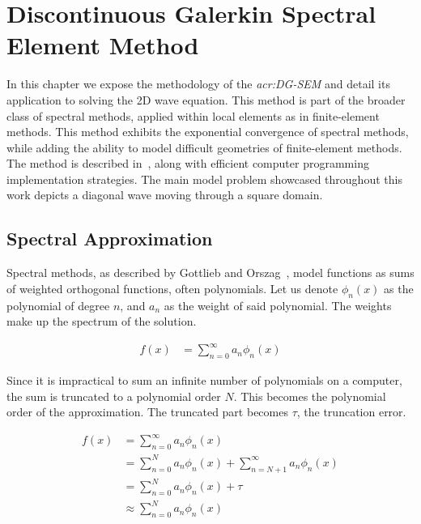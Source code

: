 \chapter{Discontinuous Galerkin Spectral Element Method}\label{chapter:spectral_element_method}

In this chapter we expose the methodology of the \textit{\acrfull{acr:DG-SEM}} and detail its
application to solving the 2D wave equation. This method is part of the broader class of spectral
methods, applied within local elements as in finite-element methods. This method exhibits the
exponential convergence of spectral methods, while adding the ability to model difficult geometries
of finite-element methods. The method is described in~\cite{Kopriva2009}, along with efficient
computer programming implementation strategies. The main model problem showcased throughout this
work depicts a diagonal wave moving through a square domain.

\section{Spectral Approximation}\label{section:spectral_element_method:spectral_approximation}

Spectral methods, as described by Gottlieb and Orszag~\cite{Gottlieb1977}, model functions as sums
of weighted orthogonal functions, often polynomials. Let us denote \(\phi_n(x)\) as the polynomial
of degree \(n\), and \(a_n\) as the weight of said polynomial. The weights make up the spectrum of
the solution.

\begin{equation} \label{equ:infinite_sum}
    \begin{split}
        f(x) & = \sum_{n = 0}^{\infty }a_n \phi_n(x)
    \end{split}
\end{equation}

Since it is impractical to sum an infinite number of polynomials on a computer, the sum is truncated
to a polynomial order \(N\). This becomes the polynomial order of the approximation. The truncated
part becomes \(\tau \), the truncation error.

\begin{equation} \label{equ:truncated_sum}
    \begin{split}
        f(x) & = \sum_{n = 0}^{\infty }a_n \phi_n(x) \\
        & = \sum_{n = 0}^{N}a_n \phi_n(x) + \sum_{n = N + 1}^{\infty }a_n \phi_n(x) \\
        & = \sum_{n = 0}^{N}a_n \phi_n(x) + \tau \\
        & \approx \sum_{n = 0}^{N}a_n \phi_n(x)
    \end{split}
\end{equation}

